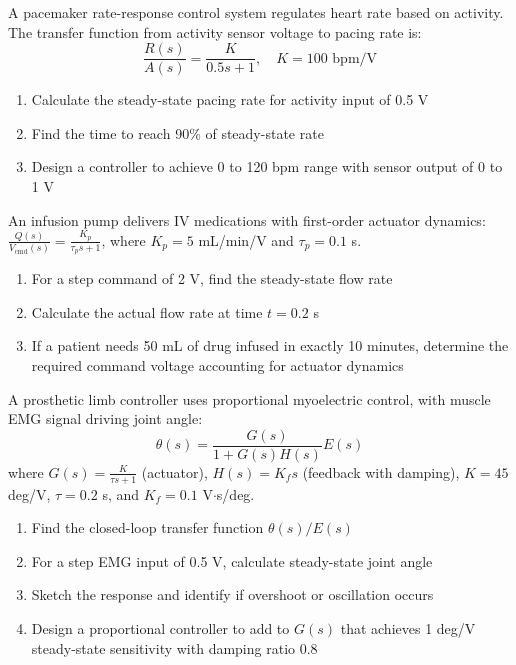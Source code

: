 \begin{exercise}
A pacemaker rate-response control system regulates heart rate based on activity. The transfer function from activity sensor voltage to pacing rate is:
\begin{equation}
\frac{R(s)}{A(s)} = \frac{K}{0.5s + 1}, \quad K = 100 \text{ bpm/V}
\end{equation}
\begin{enumerate}[label=(\alph*)]
    \item Calculate the steady-state pacing rate for activity input of 0.5 V
    \item Find the time to reach 90\% of steady-state rate
    \item Design a controller to achieve 0 to 120 bpm range with sensor output of 0 to 1 V
\end{enumerate}
\end{exercise}

\begin{exercise}
An infusion pump delivers IV medications with first-order actuator dynamics: $\frac{Q(s)}{V_{\text{cmd}}(s)} = \frac{K_p}{\tau_p s + 1}$, where $K_p = 5$ mL/min/V and $\tau_p = 0.1$ s.
\begin{enumerate}[label=(\alph*)]
    \item For a step command of 2 V, find the steady-state flow rate
    \item Calculate the actual flow rate at time $t = 0.2$ s
    \item If a patient needs 50 mL of drug infused in exactly 10 minutes, determine the required command voltage accounting for actuator dynamics
\end{enumerate}
\end{exercise}

\begin{exercise}
A prosthetic limb controller uses proportional myoelectric control, with muscle EMG signal driving joint angle:
\begin{equation}
\theta(s) = \frac{G(s)}{1 + G(s)H(s)}E(s)
\end{equation}
where $G(s) = \frac{K}{\tau s + 1}$ (actuator), $H(s) = K_f s$ (feedback with damping), $K = 45$ deg/V, $\tau = 0.2$ s, and $K_f = 0.1$ V$\cdot$s/deg.
\begin{enumerate}[label=(\alph*)]
    \item Find the closed-loop transfer function $\theta(s)/E(s)$
    \item For a step EMG input of 0.5 V, calculate steady-state joint angle
    \item Sketch the response and identify if overshoot or oscillation occurs
    \item Design a proportional controller to add to $G(s)$ that achieves 1 deg/V steady-state sensitivity with damping ratio 0.8
\end{enumerate}
\end{exercise}

